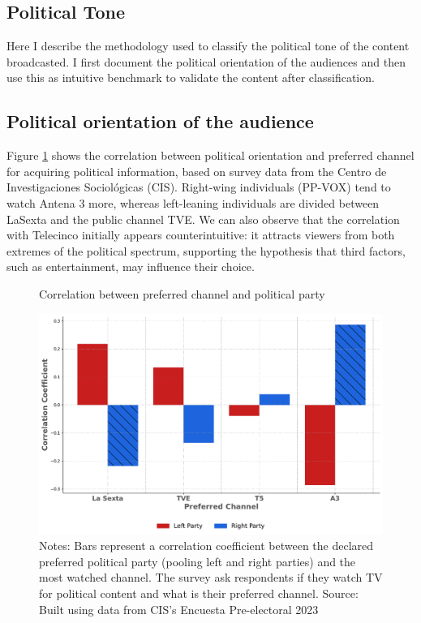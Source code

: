 \documentclass[12pt]{article}
\begin{document}
	
	
	
	\subsection{ Political Tone}
	
	
	Here I describe the methodology used to classify the political tone of the content broadcasted. I first document the political orientation of the audiences and then use this as intuitive benchmark to validate the content after classification. 
	
	
	\subsection*{Political orientation of the audience }
	
	
	Figure \ref{opinion} shows the correlation between political orientation and preferred channel for acquiring political information, based on survey data from the Centro de Investigaciones Sociológicas (CIS). Right-wing individuals (PP-VOX) tend to watch Antena 3 more, whereas left-leaning individuals are divided between LaSexta and the public channel TVE. We can also observe that the correlation with Telecinco initially appears counterintuitive: it attracts viewers from both extremes of the political spectrum, supporting the hypothesis that third factors, such as entertainment, may influence their choice.
	
	\begin{figure}[h!]
		\centering
		\caption{Correlation between preferred channel and political party}
		\includegraphics[width=120mm]{figures/corr_party_channel3}
		\caption*{\small Notes:  Bars represent a correlation coefficient between the declared preferred political party (pooling left and right parties) and the most watched channel. The survey ask respondents if they watch TV for political content and what is their preferred channel. Source: Built using data from CIS's Encuesta Pre-electoral 2023 }
		\label{opinion}
	\end{figure}
	
\end{document}
